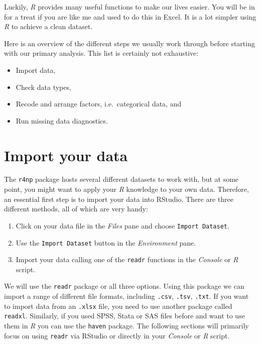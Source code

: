 \documentclass[
  letterpaper,
]{krantz}
\begin{document}
Luckily, \emph{R} provides many useful functions to make our lives
easier. You will be in for a treat if you are like me and used to do
this in Excel. It is a lot simpler using \emph{R} to achieve a clean
dataset.

Here is an overview of the different steps we usually work through
before starting with our primary analysis. This list is certainly not
exhaustive:

\begin{itemize}
\item
  Import data,
\item
  Check data types,
\item
  Recode and arrange factors, i.e.~categorical data, and
\item
  Run missing data diagnostics.
\end{itemize}

\section{Import your data}\label{import-your-data}

The \texttt{r4np} package hosts several different datasets to work with,
but at some point, you might want to apply your \emph{R} knowledge to
your own data. Therefore, an essential first step is to import your data
into RStudio. There are three different methods, all of which are very
handy:

\begin{enumerate}
\def\labelenumi{\arabic{enumi}.}
\item
  Click on your data file in the \emph{Files} pane and choose
  \texttt{Import\ Dataset}.
\item
  Use the \texttt{Import\ Dataset} button in the \emph{Environment}
  pane.
\item
  Import your data calling one of the \texttt{readr} functions in the
  \emph{Console} or \emph{R} script.
\end{enumerate}

We will use the \texttt{readr} package or all three options. Using this
package we can import a range of different file formats, including
\texttt{.csv}, \texttt{.tsv}, \texttt{.txt}. If you want to import data
from an \texttt{.xlsx} file, you need to use another package called
\texttt{readxl}. Similarly, if you used SPSS, Stata or SAS files before
and want to use them in \emph{R} you can use the \texttt{haven} package.
The following sections will primarily focus on using \texttt{readr} via
RStudio or directly in your \emph{Console} or \emph{R} script.
\end{document}
